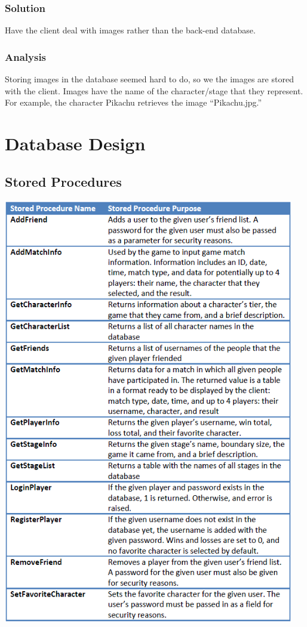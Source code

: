 \documentclass{article}
\begin{document}
\subsubsection{Solution}
Have the client deal with images rather than the back-end database.
\subsubsection{Analysis}
Storing images in the database seemed hard to do, so we the images are stored with the client. Images have the name of the character/stage that they represent. For example, the character Pikachu retrieves the image “Pikachu.jpg.”

\section{Database Design}
\subsection{Stored Procedures}
\includegraphics[keepaspectratio, width=5in]{Sprocs.png}\\
\end{document}
